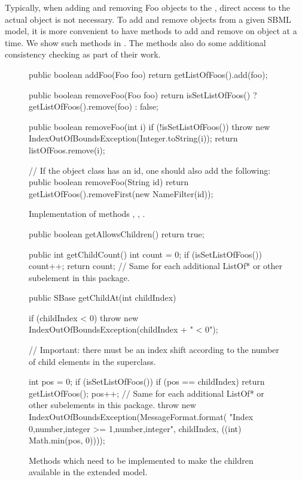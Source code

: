 Typically, when adding and removing Foo objects to the \Model, direct
access to the actual  object is not necessary.  To add and
remove  objects from a given SBML model, it is more convenient to
have methods to add and remove on  object at a time.  We show
such methods in .  The methods also
do some additional consistency checking as part of their work.

\begin{figure}[t]
  \begin{example}[numbers=left]
public boolean addFoo(Foo foo) {
    return getListOfFoos().add(foo);
}

public boolean removeFoo(Foo foo) {
  return isSetListOfFoos() ? getListOfFoos().remove(foo) : false;
}

public boolean removeFoo(int i) {
  if (!isSetListOfFoos()) {
    throw new IndexOutOfBoundsException(Integer.toString(i));
  }
  return listOfFoos.remove(i);
}

// If the object class has an id, one should also add the following:
public boolean removeFoo(String id) {
  return getListOfFoos().removeFirst(new NameFilter(id));
}\end{example}
  \caption{Implementation of  methods ,
    , .}
  \label{lst:ModelExtAddRemoveFoos}
\end{figure}

\begin{figure}[hb]
  \begin{example}[numbers=left]
public boolean getAllowsChildren() {
  return true;
}

public int getChildCount() {
  int count = 0;
  if (isSetListOfFoos()) {
    count++;
  }
  return count;  // Same for each additional ListOf* or other subelement in this package.
}

public SBase getChildAt(int childIndex) {
  if (childIndex < 0) {
    throw new IndexOutOfBoundsException(childIndex + " < 0");
  }

  // Important: there must be an index shift according to the number of child elements in the superclass.

  int pos = 0;
  if (isSetListOfFoos()) {
    if (pos == childIndex) {
      return getListOfFoos();
    }
    pos++;
  }
  // Same for each additional ListOf* or other subelements in this package.
  throw new IndexOutOfBoundsException(MessageFormat.format(
    "Index {0,number,integer} >= {1,number,integer}", childIndex, ((int) Math.min(pos, 0))));
}\end{example}
  \caption{Methods which need to be implemented to make the children
    available in the extended model.}
  \label{lst:ModelExtChildren}
\end{figure}

